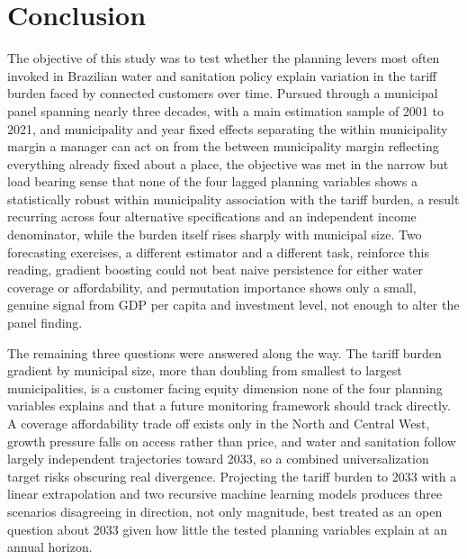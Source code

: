\documentclass[preprint,12pt]{elsarticle}
\begin{document}
\section{Conclusion}\label{sec13}

The objective of this study was to test whether the planning levers most often invoked in Brazilian water and sanitation policy explain variation in the tariff burden faced by connected customers over time. Pursued through a municipal panel spanning nearly three decades, with a main estimation sample of 2001 to 2021, and municipality and year fixed effects separating the within municipality margin a manager can act on from the between municipality margin reflecting everything already fixed about a place, the objective was met in the narrow but load bearing sense that none of the four lagged planning variables shows a statistically robust within municipality association with the tariff burden, a result recurring across four alternative specifications and an independent income denominator, while the burden itself rises sharply with municipal size. Two forecasting exercises, a different estimator and a different task, reinforce this reading, gradient boosting could not beat naive persistence for either water coverage or affordability, and permutation importance shows only a small, genuine signal from GDP per capita and investment level, not enough to alter the panel finding.

The remaining three questions were answered along the way. The tariff burden gradient by municipal size, more than doubling from smallest to largest municipalities, is a customer facing equity dimension none of the four planning variables explains and that a future monitoring framework should track directly. A coverage affordability trade off exists only in the North and Central West, growth pressure falls on access rather than price, and water and sanitation follow largely independent trajectories toward 2033, so a combined universalization target risks obscuring real divergence. Projecting the tariff burden to 2033 with a linear extrapolation and two recursive machine learning models produces three scenarios disagreeing in direction, not only magnitude, best treated as an open question about 2033 given how little the tested planning variables explain at an annual horizon.
\end{document}

